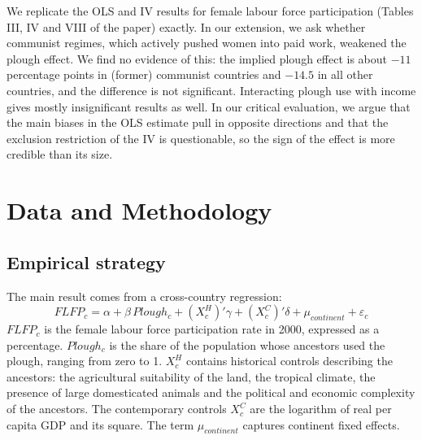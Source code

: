 \documentclass[12pt,a4paper]{article}
\newif\ifshowinstr
\newcommand{\instr}[1]{\ifshowinstr{\leavevmode\color{gray}\itshape\small [#1]\par}\fi}
\begin{document}
We replicate the OLS and IV results for female labour force participation (Tables III, IV and VIII of the paper) exactly. In our extension, we ask whether communist regimes, which actively pushed women into paid work, weakened the plough effect. We find no evidence of this: the implied plough effect is about $-11$ percentage points in (former) communist countries and $-14.5$ in all other countries, and the difference is not significant. Interacting plough use with income gives mostly insignificant results as well. In our critical evaluation, we argue that the main biases in the OLS estimate pull in opposite directions and that the exclusion restriction of the IV is questionable, so the sign of the effect is more credible than its size.

\section{Data and Methodology}

\subsection{Empirical strategy}

\instr{Think about what you need to explain the identification strategy of the authors and why they believe that it is valid. Appendix~B.1 summarizes the main points for OLS, panel data and IV designs. You can use these as a reference.}

The main result comes from a cross-country regression:
\begin{equation}\label{eq:ols}
  FLFP_c = \alpha + \beta\, Plough_c + (X_c^{H})'\gamma + (X_c^{C})'\delta + \mu_{continent} + \varepsilon_c
\end{equation}
$FLFP_c$ is the female labour force participation rate in 2000, expressed as a percentage. $Plough_c$ is the share of the population whose ancestors used the plough, ranging from zero to 1. $X_c^{H}$ contains historical controls describing the ancestors: the agricultural suitability of the land, the tropical climate, the presence of large domesticated animals and the political and economic complexity of the ancestors. The contemporary controls $X_c^{C}$ are the logarithm of real per capita GDP and its square. The term $\mu_{continent}$ captures continent fixed effects.
\end{document}
